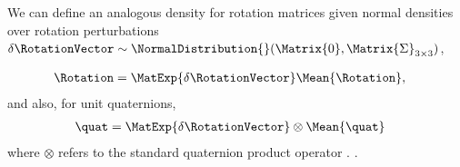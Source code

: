 We can define an analogous density for rotation matrices given normal densities over rotation perturbations $\delta \RotationVector \sim \NormalDistribution{}(\Matrix{0}, \Matrix{\Sigma}_{3 \times 3})$,

\begin{align}
\Rotation &= \MatExp{\delta \RotationVector} \Mean{\Rotation}, 
\end{align}
and also, for unit quaternions,
\begin{align}
\quat &= \MatExp{\delta \RotationVector} \otimes \Mean{\quat} 
\end{align}
where $\otimes$ refers to the standard quaternion product operator \cite{Sola2017quaternion}. .



 